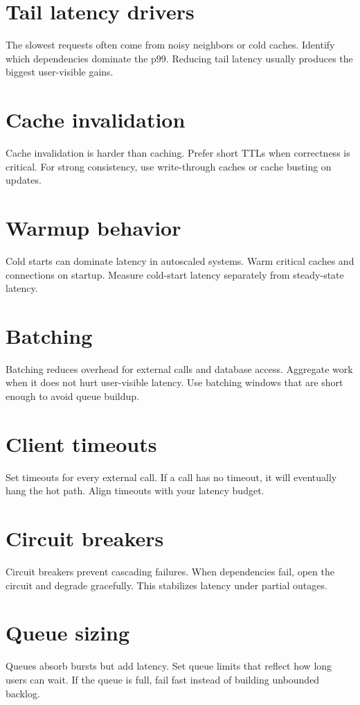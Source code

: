 \section{Tail latency drivers}
The slowest requests often come from noisy neighbors or cold caches.
Identify which dependencies dominate the p99.
Reducing tail latency usually produces the biggest user-visible gains.

\section{Cache invalidation}
Cache invalidation is harder than caching.
Prefer short TTLs when correctness is critical.
For strong consistency, use write-through caches or cache busting on updates.

\section{Warmup behavior}
Cold starts can dominate latency in autoscaled systems.
Warm critical caches and connections on startup.
Measure cold-start latency separately from steady-state latency.

\section{Batching}
Batching reduces overhead for external calls and database access.
Aggregate work when it does not hurt user-visible latency.
Use batching windows that are short enough to avoid queue buildup.

\section{Client timeouts}
Set timeouts for every external call.
If a call has no timeout, it will eventually hang the hot path.
Align timeouts with your latency budget.

\section{Circuit breakers}
Circuit breakers prevent cascading failures.
When dependencies fail, open the circuit and degrade gracefully.
This stabilizes latency under partial outages.

\section{Queue sizing}
Queues absorb bursts but add latency.
Set queue limits that reflect how long users can wait.
If the queue is full, fail fast instead of building unbounded backlog.

